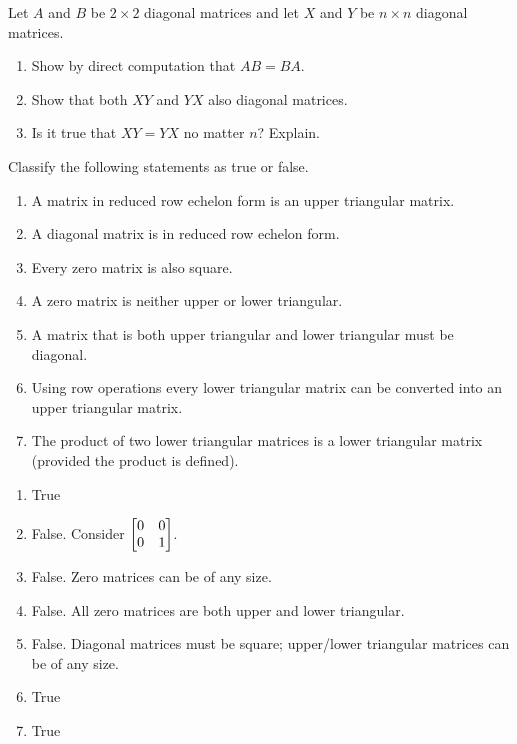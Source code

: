 \begin{exercises}
\begin{problist}
		Let $A$ and $B$ be $2\times 2$ diagonal matrices and let $X$ and $Y$ be $n\times n$ diagonal matrices.
		\begin{enumerate}
			\item Show by direct computation that $AB=BA$.
			\item Show that both $XY$ and $YX$ also diagonal matrices.
			\item Is it true that $XY=YX$ no matter $n$? Explain.
		\end{enumerate}

		\prob Classify the following statements as true or false.
		\begin{enumerate}
			\item A matrix in reduced row echelon form is an upper triangular matrix.
			\item A diagonal matrix is in reduced row echelon form.
			\item Every zero matrix is also square.
			\item A zero matrix is neither upper or lower triangular.
			\item A matrix that is both upper triangular and lower triangular must be diagonal.
			\item Using row operations every lower triangular matrix can be converted into an upper triangular matrix.
			\item The product of two lower triangular matrices is a lower triangular matrix (provided the product
				is defined).
		\end{enumerate}
		\begin{solution}
			\begin{enumerate}
				\item True
				\item False. Consider $\mat{0&0\\0&1}$.
				\item False. Zero matrices can be of any size.
				\item False. All zero matrices are both upper and lower triangular.
				\item False. Diagonal matrices must be square; upper/lower triangular matrices can be of any size.
				\item True
				\item True
			\end{enumerate}
		\end{solution}


\end{problist}
\end{exercises}
